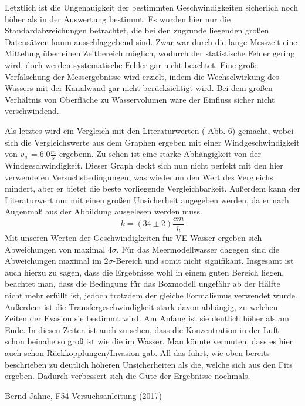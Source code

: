 \documentclass[12pt]{article}
\begin{document}
Letztlich ist die Ungenauigkeit der bestimmten Geschwindigkeiten sicherlich noch höher als in der Auswertung bestimmt. Es wurden hier nur die Standardabweichungen betrachtet, die bei den zugrunde liegenden großen Datensätzen kaum ausschlaggebend sind. Zwar war durch die lange Messzeit eine Mittelung über einen Zeitbereich möglich, wodurch der statistische Fehler gering wird, doch werden systematische Fehler gar nicht beachtet. Eine große Verfälschung der Messergebnisse wird erzielt, indem die Wechselwirkung des Wassers mit der Kanalwand gar nicht berücksichtigt wird. Bei dem großen Verhältnis von Oberfläche zu Wasservolumen wäre der Einfluss sicher nicht verschwindend.

Als letztes wird ein Vergleich mit den Literaturwerten (\cite{jaehne} Abb. 6) gemacht, wobei sich die Vergleichswerte aus dem Graphen ergeben mit einer Windgeschwindigkeit von $v_w = 6.0 \frac{m}{s}$
ergebenn. Zu sehen ist eine starke Abhängigkeit von der Windgeschwindigkeit. Dieser Graph deckt sich nun nicht perfekt mit den hier verwendeten Versuchsbedingungen, was wiederum den Wert des Vergleichs mindert, aber er bietet die beste vorliegende Vergleichbarkeit. Außerdem kann der Literaturwert nur mit einen großen Unsicherheit angegeben werden, da er nach Augenmaß aus der Abbildung ausgelesen werden muss.
\begin{equation}
	k = (34 \pm 2) \frac{cm}{h}
\end{equation}
Mit unseren Werten der Geschwindigkeiten für VE-Wasser ergeben sich Abweichungen von maximal $4 \sigma$. Für das Meermodellwasser dagegen sind die Abweichungen maximal im $2\sigma$-Bereich und somit nicht signifikant. Insgesamt ist auch hierzu zu sagen, dass die Ergebnisse wohl in einem guten Bereich liegen, beachtet man, dass die Bedingung für das Boxmodell ungefähr ab der Hälfte nicht mehr erfüllt ist, jedoch trotzdem der gleiche Formalismus verwendet wurde. Außerdem ist die Transfergeschwindigkeit stark davon abhängig, zu welchen Zeiten der Evasion sie bestimmt wird. Am Anfang ist sie deutlich höher als am Ende. In diesen Zeiten ist auch zu sehen, dass die Konzentration in der Luft schon beinahe so groß ist wie die im Wasser. Man könnte vermuten, dass es hier auch schon Rückkopplungen/Invasion gab. All das führt, wie oben bereits beschrieben zu deutlich höheren Unsicherheiten als die, welche sich aus den Fits ergeben. Dadurch verbessert sich die Güte der Ergebnisse nochmals.

\newpage


\begin{thebibliography}{00}   %

 Bernd J\"ahne, F54 Versuchsanleitung (2017)

\end{thebibliography}
\end{document}
